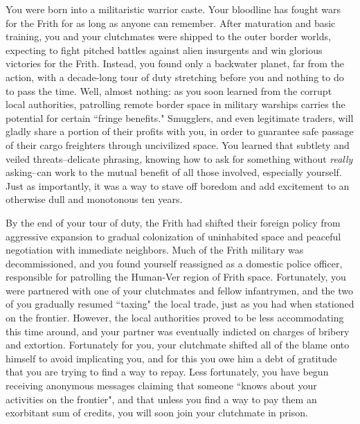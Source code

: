 \documentclass[char]{guildcamp4}
\begin{document}
\name{\cCbad{}}

You were born into a militaristic warrior caste. Your bloodline has fought wars for the Frith for as long as anyone can remember. After maturation and basic training, you and your clutchmates were shipped to the outer border worlds, expecting to fight pitched battles against alien insurgents and win glorious victories for the Frith. Instead, you found only a backwater planet, far from the action, with a decade-long tour of duty stretching before you and nothing to do to pass the time. Well, almost nothing: as you soon learned from the corrupt local authorities, patrolling remote border space in military warships carries the potential for certain ``fringe benefits." Smugglers, and even legitimate traders, will gladly share a portion of their profits with you, in order to guarantee safe passage of their cargo freighters through uncivilized space. You learned that subtlety and veiled threats--delicate phrasing, knowing how to ask for something without \textit{really} asking--can work to the mutual benefit of all those involved, especially yourself. Just as importantly, it was a way to stave off boredom and add excitement to an otherwise dull and monotonous ten years.

By the end of your tour of duty, the Frith had shifted their foreign policy from aggressive expansion to gradual colonization of uninhabited space and peaceful negotiation with immediate neighbors. Much of the Frith military was decommissioned, and you found yourself reassigned as a domestic police officer, responsible for patrolling the Human-Ver region of Frith space. Fortunately, you were partnered with one of your clutchmates and fellow infantrymen, and the two of you gradually resumed ``taxing" the local trade, just as you had when stationed on the frontier. However, the local authorities proved to be less accommodating this time around, and your partner was eventually indicted on charges of bribery and extortion. Fortunately for you, your clutchmate shifted all of the blame onto himself to avoid implicating you, and for this you owe him a debt of gratitude that you are trying to find a way to repay. Less fortunately, you have begun receiving anonymous messages claiming that someone ``knows about your activities on the frontier", and that unless you find a way to pay them an exorbitant sum of credits, you will soon join your clutchmate in prison.
\end{document}
